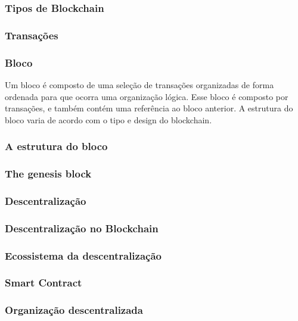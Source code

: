     \subsubsection{Tipos de Blockchain}

    \subsubsection{Transações}

    \subsubsection{Bloco}

        Um bloco é composto de uma seleção de transações organizadas de forma ordenada para que ocorra uma organização lógica. Esse bloco é composto por transações, e também contém uma referência ao bloco anterior. A estrutura do bloco varia de acordo com o tipo e design do blockchain.\cite{mastering_blockchain}
        
        \subsubsection{A estrutura do bloco}
        \subsubsection{The genesis block}
    
    \subsubsection{Descentralização}

        \subsubsection{Descentralização no Blockchain}

        \subsubsection{Ecossistema da descentralização}

        \subsubsection{Smart Contract}

        \subsubsection{Organização descentralizada}

